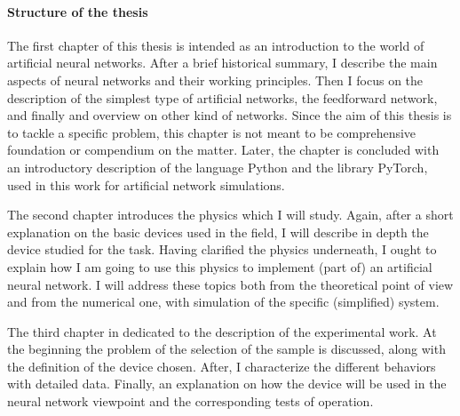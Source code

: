 \paragraph{Structure of the thesis\\}

The first chapter of this thesis is intended as an introduction to the world of artificial neural networks.
After a brief historical summary, I describe the main aspects of neural networks and their working principles.
Then I focus on the description of the simplest type of artificial networks, the feedforward network, and finally and overview on other kind of networks.
Since the aim of this thesis is to tackle a specific problem, this chapter is not meant to be comprehensive foundation or compendium on the matter.
Later, the chapter is concluded with an introductory description of the language Python and the library PyTorch, used in this work for artificial network simulations.

The second chapter introduces the physics which I will study.
Again, after a short explanation on the basic devices used in the field, I will describe in depth the device studied for the task.
Having clarified the physics underneath, I ought to explain how I am going to use this physics to implement (part of) an artificial neural network.
I will address these topics both from the theoretical point of view and from the numerical one, with simulation of the specific (simplified) system.

The third chapter in dedicated to the description of the experimental work.
At the beginning the problem of the selection of the sample is discussed, along with the definition of the device chosen.
After, I characterize the different behaviors with detailed data.
Finally, an explanation on how the device will be used in the neural network viewpoint and the corresponding tests of operation.
